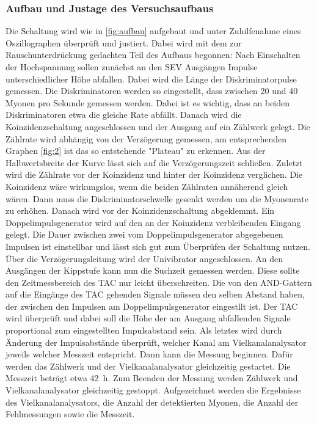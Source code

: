 \documentclass[
  bibliography=totoc,     %
  captions=tableheading,  %
  titlepage=firstiscover, %
]{scrartcl}
\begin{document}
  \subsubsection{Aufbau und Justage des Versuchsaufbaus}
  Die Schaltung wird wie in \ref{fig:aufbau} aufgebaut und unter Zuhilfenahme eines Oszillographen
  überprüft und justiert. Dabei wird mit dem zur Rauschunterdrückung gedachten
  Teil des Aufbaus begonnen:
  Nach Einschalten der Hochspannung sollen zunächst an den SEV Ausgängen Impulse
  unterschiedlicher Höhe abfallen.
  Dabei wird die Länge der Diskriminatorpulse gemessen.
  Die Diskriminatoren werden so eingestellt, dass zwischen 20 und 40
  Myonen pro Sekunde gemessen werden. Dabei ist es wichtig, dass an beiden
  Diskriminatoren etwa die gleiche Rate abfällt.
  Danach wird die Koinzidenzschaltung angeschlossen und der Ausgang auf ein
  Zählwerk gelegt. Die Zählrate wird abhängig von der Verzögerung gemessen, am
  entsprechenden Graphen \ref{fig:2} ist das so entstehende "Plateau" zu erkennen. Aus der Halbwertsbreite
  der Kurve lässt sich auf die Verzögerungszeit schließen.
  Zuletzt wird die Zählrate vor der Koinzidenz und hinter der Koinzidenz verglichen.
  Die Koinzidenz wäre wirkungslos, wenn die beiden Zählraten annäherend gleich wären.
  Dann muss die Diskriminatorschwelle gesenkt werden um die
  Myonenrate zu erhöhen.
  Danach wird vor der Koinzidenzschaltung abgeklemmt. Ein
  Doppelimpulsgenerator wird auf den an der Koinzidenz verbleibenden Eingang gelegt.
  Die Dauer zwischen zwei vom Doppelimpulsgenerator abgegebenen Impulsen ist einstellbar
  und lässt sich gut zum Überprüfen der Schaltung nutzen.
  Über die Verzögerungsleitung wird der Univibrator angeschlossen. An den
  Ausgängen der Kippstufe kann nun die Suchzeit gemessen werden. Diese sollte den
  Zeitmessbereich des TAC nur leicht überschreiten. Die von
  den AND-Gattern auf die Eingänge des TAC gehenden Signale müssen den selben Abstand
  haben, der zwischen den Impulsen am Doppelimpulsgenerator eingestllt ist.
  Der TAC wird überprüft und dabei soll die Höhe der am Ausgang abfallenden Signale
  proportional zum eingestellten Impulsabstand sein.
  Als letztes wird durch Änderung der Impulsabstände überprüft, welcher Kanal
  am Vielkanalanalysator jeweils welcher Messzeit entspricht. Dann kann die Messung
  beginnen. Dafür werden das Zählwerk und der Vielkanalanalysator gleichzeitig
  gestartet. Die Messzeit beträgt etwa \SI{42}{\hour}.
  Zum Beenden der Messung werden Zählwerk und Vielkanalanalysator gleichzeitig gestoppt.
  Aufgezeichnet werden die Ergebnisse des Vielkanalanalysators, die Anzahl der detektierten
  Myonen, die Anzahl der Fehlmessungen sowie die Messzeit.
\end{document}
